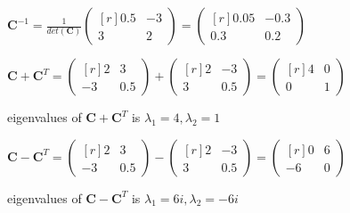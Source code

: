 \documentclass[a4paper,fleqn]{article}
\newcommand{\newvec}[1]{
    \begin{pmatrix*}[r]
        #1
    \end{pmatrix*}
}
\begin{document}
\begin{enumerate}
        \vspace{0.5cm}
        $\mathbf{C}^{-1}=\frac{1}{det({\mathbf{C}})}\newvec{0.5&-3\\3&2}=\newvec{0.05&-0.3\\0.3&0.2}$

        \vspace{0.5cm}
        $\mathbf{C}+\mathbf{C}^T = \newvec{2&3\\-3&0.5}+\newvec{2&-3\\3&0.5}=\newvec{4&0\\0&1}$

        eigenvalues of $\mathbf{C}+\mathbf{C}^T$ is $\lambda_1=4, \lambda_2=1$

        \vspace{0.5cm}
        $\mathbf{C}-\mathbf{C}^T = \newvec{2&3\\-3&0.5}-\newvec{2&-3\\3&0.5}=\newvec{0&6\\-6&0}$

        eigenvalues of $\mathbf{C}-\mathbf{C}^T$ is $\lambda_1=6i, \lambda_2=-6i$
    \end{enumerate}
\end{document}
